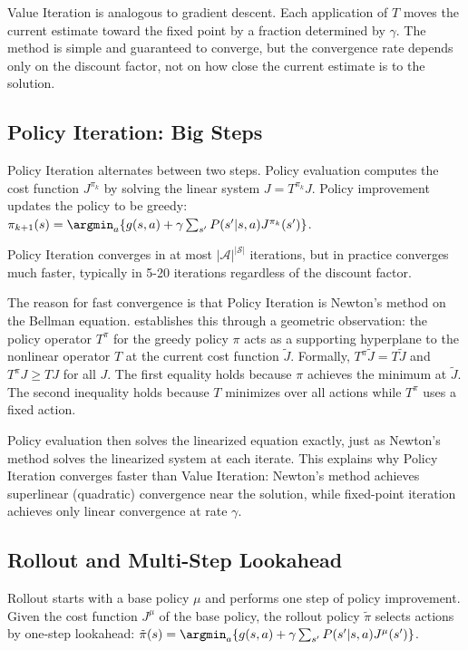Value Iteration is analogous to gradient descent. Each application of $T$ moves the current estimate toward the fixed point by a fraction determined by $\gamma$. The method is simple and guaranteed to converge, but the convergence rate depends only on the discount factor, not on how close the current estimate is to the solution.


\subsection{Policy Iteration: Big Steps}
\label{sec:pi}

Policy Iteration alternates between two steps. Policy evaluation computes the cost function $J^{\pi_k}$ by solving the linear system $J = T^{\pi_k} J$. Policy improvement updates the policy to be greedy: $\pi_{k+1}(s) = \argmin_{a} \{ g(s,a) + \gamma \sum_{s'} P(s'|s,a) J^{\pi_k}(s') \}$.

Policy Iteration converges in at most $|\mathcal{A}|^{|\mathcal{S}|}$ iterations, but in practice converges much faster, typically in 5-20 iterations regardless of the discount factor.

The reason for fast convergence is that Policy Iteration is Newton's method on the Bellman equation. \citet{bertsekas2024} establishes this through a geometric observation: the policy operator $T^{\pi}$ for the greedy policy $\pi$ acts as a supporting hyperplane to the nonlinear operator $T$ at the current cost function $\tilde{J}$. Formally, $T^{\pi} \tilde{J} = T\tilde{J}$ and $T^{\pi} J \geq TJ$ for all $J$. The first equality holds because $\pi$ achieves the minimum at $\tilde{J}$. The second inequality holds because $T$ minimizes over all actions while $T^{\pi}$ uses a fixed action.

Policy evaluation then solves the linearized equation exactly, just as Newton's method solves the linearized system at each iterate. This explains why Policy Iteration converges faster than Value Iteration: Newton's method achieves superlinear (quadratic) convergence near the solution, while fixed-point iteration achieves only linear convergence at rate $\gamma$.


\subsection{Rollout and Multi-Step Lookahead}
\label{sec:rollout}

Rollout starts with a base policy $\mu$ and performs one step of policy improvement. Given the cost function $J^\mu$ of the base policy, the rollout policy $\tilde{\pi}$ selects actions by one-step lookahead: $\tilde{\pi}(s) = \argmin_{a} \{ g(s,a) + \gamma \sum_{s'} P(s'|s,a) J^\mu(s') \}$.

